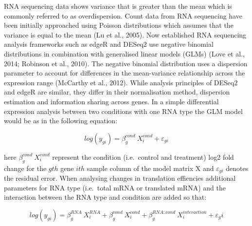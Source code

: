 \documentclass[
  12pt,
  openany]{book}
\begin{document}
RNA sequencing data shows variance that is greater than the mean which is commonly referred to as overdispersion. Count data from RNA sequencing have been initially approached using Poisson distributions which assumes that the variance is equal to the mean (Lu et al., 2005). Now established RNA sequencing analysis frameworks such as edgeR and DESeq2 use negative binomial distributions in combination with generalised linear models (GLMs) (Love et al., 2014; Robinson et al., 2010). The negative binomial distribution uses a dispersion parameter to account for differences in the mean-variance relationship across the expression range (McCarthy et al., 2012). While analysis principles of DESeq2 and edgeR are similar, they differ in their normalisation method, dispersion estimation and information sharing across genes. In a simple differential expression analysis between two conditions with one RNA type the GLM model would be as in the following equation:

\[log(y_{gi}) = \beta_g^{cond}\ X_i^{cond} + \varepsilon_{gi}\]

here \(\beta_g^{cond}\ X_i^{cond}\) represent the condition (i.e.~control and treatment) log2 fold change for the \(gth\) gene \(ith\) sample column of the model matrix X and \(\varepsilon_{gi}\) denotes the residual error. When analysing changes in translation effiencies additional parameters for RNA type (i.e.~total mRNA or translated mRNA) and the interaction between the RNA type and condition are added so that:

\[log(y_{gi}) = \beta_g^{RNA}\ X_i^{RNA}+ \beta_g^{cond}\ X_i^{cond} + \beta_g^{RNA:cond}\ X_i^{interaction} + \varepsilon_gi\]
\end{document}
